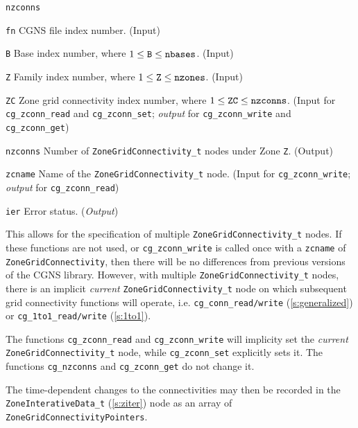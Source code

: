 \begin{Ventryi}{\texttt{nzconns}}\raggedright
\item [\texttt{fn}]
      CGNS file index number.
      (\textcolor{input}{Input})
\item [\texttt{B}]
      Base index number, where $1 \leq \text{\texttt{B}} \leq \text{\texttt{nbases}}$.
      (\textcolor{input}{Input})
\item [\texttt{Z}]
      Family index number, where $1 \leq \text{\texttt{Z}} \leq \text{\texttt{nzones}}$.
      (\textcolor{input}{Input})
\item [\texttt{ZC}]
      Zone grid connectivity index number, where $1 \leq \text{\texttt{ZC}} \leq \text{\texttt{nzconns}}$.
      (\textcolor{input}{Input} for \texttt{cg\_zconn\_read} and
      \texttt{cg\_zconn\_set};
      \textcolor{output}{\textit{output}} for \texttt{cg\_zconn\_write}
      and \texttt{cg\_zconn\_get})
\item [\texttt{nzconns}]
      Number of \texttt{ZoneGridConnectivity\_t} nodes under Zone \texttt{Z}.
      (\textcolor{output}{Output})
\item [\texttt{zcname}]
      Name of the \texttt{ZoneGridConnectivity\_t} node.
      (\textcolor{input}{Input} for \texttt{cg\_zconn\_write};
      \textcolor{output}{\textit{output}} for \texttt{cg\_zconn\_read})
\item [\texttt{ier}]
      Error status.
      (\textcolor{output}{\textit{Output}})
\end{Ventryi}

This allows for the specification of multiple \texttt{ZoneGridConnectivity\_t}
nodes. If these functions are not used, or \texttt{cg\_zconn\_write}
is called once with a \texttt{zcname} of \texttt{ZoneGridConnectivity},
then there will be no differences from previous versions of the
CGNS library. However, with multiple \texttt{ZoneGridConnectivity\_t}
nodes, there is an implicit \textit{current} \texttt{ZoneGridConnectivity\_t}
node on which subsequent grid connectivity functions will operate,
i.e. \texttt{cg\_conn\_read/write} (\autoref{s:generalized}) or
\texttt{cg\_1to1\_read/write} (\autoref{s:1to1}).

The functions \texttt{cg\_zconn\_read} and \texttt{cg\_zconn\_write}
will implicity set the \textit{current} \texttt{ZoneGridConnectivity\_t}
node, while \texttt{cg\_zconn\_set} explicitly sets it. The functions
\texttt{cg\_nzconns} and \texttt{cg\_zconn\_get} do not change it.

The time-dependent changes to the connectivities may then be recorded
in the \texttt{ZoneInterativeData\_t} (\autoref{s:ziter}) node as an
array of \texttt{ZoneGridConnectivityPointers}.

